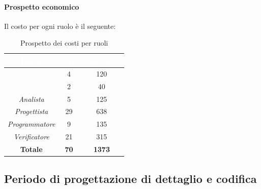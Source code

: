 \paragraph*{Prospetto economico}
Il costo per ogni ruolo è il seguente:
\begin{table}[H]
	\begin{center}
		\begin{tabular}{ |c c c| }
			\rowcolor{darkblue} 
			\textcolor{white}{\textbf{Ruolo}} & \textcolor{white}{\textbf{Ore}} & \textcolor{white}{\textbf{Costo in €}}\\ \hline
			{\Responsabile} 			& 4 & 120 \\ \hline
			{\Amministratore} 			& 2 & 40 \\ \hline
			\textit{Analista} 			& 5 & 125 \\ \hline
			\textit{Progettista} 		& 29 & 638\\ \hline
			\textit{Programmatore}  	& 9 & 135 \\ \hline
			\textit{Verificatore} 		& 21 & 315 \\ \hline
			\textbf{Totale} & \textbf{70} & \textbf{1373} \\ \hline
		\end{tabular}
		\caption{Prospetto dei costi per ruoli}
	\end{center}
\end{table}

\newpage
\subsection{Periodo di progettazione di dettaglio e codifica}
